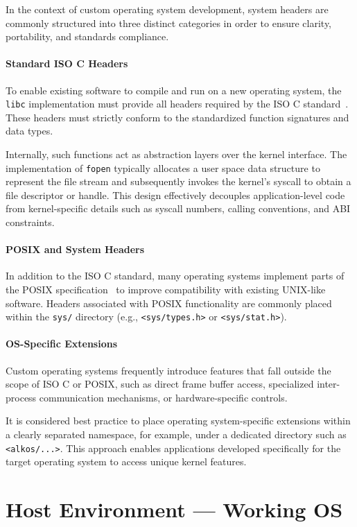 \documentclass[a4paper,10pt,twoside]{report}
\theoremstyle{definition}
\begin{document}
In the context of custom operating system development, system headers are commonly structured into three distinct categories in order to ensure clarity, portability, and standards compliance.

\paragraph{Standard ISO C Headers}
To enable existing software to compile and run on a new operating system, the \texttt{libc} implementation must provide all headers required by the ISO C standard~\cite{iso_c_std}. These headers must strictly conform to the standardized function signatures and data types.

Internally, such functions act as abstraction layers over the kernel interface. The implementation of \texttt{fopen} typically allocates a user space data structure to represent the file stream and subsequently invokes the kernel's syscall to obtain a file descriptor or handle. This design effectively decouples application-level code from kernel-specific details such as syscall numbers, calling conventions, and ABI constraints.

\paragraph{POSIX and System Headers}
In addition to the ISO C standard, many operating systems implement parts of the POSIX specification~\cite{posix_std} to improve compatibility with existing UNIX-like software. Headers associated with POSIX functionality are commonly placed within the \texttt{sys/} directory (e.g., \texttt{<sys/types.h>} or \texttt{<sys/stat.h>}).

\paragraph{OS-Specific Extensions}
Custom operating systems frequently introduce features that fall outside the scope of ISO C or POSIX, such as direct frame buffer access, specialized inter-process communication mechanisms, or hardware-specific controls.

It is considered best practice to place operating system-specific extensions within a clearly separated namespace, for example, under a dedicated directory such as \texttt{<alkos/...>}. This approach enables applications developed specifically for the target operating system to access unique kernel features.

\section{Host Environment --- Working OS}
\label{sec:host_env}
\end{document}
